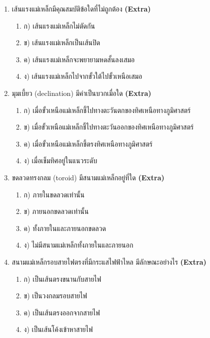 \documentclass[12pt]{article}
\begin{document}
\begin{enumerate}[label=\arabic*.]
\begin{enumerate}[label=)]
\item ก) เพิ่มเป็น 2 เท่า
\item ข) เพิ่มเป็น 4 เท่า
\item ค) ลดลงเป็น 1/2 เท่า
\item ง) ไม่เปลี่ยนแปลง
\end{enumerate}
\item เส้นแรงแม่เหล็กมีคุณสมบัติข้อใดที่ไม่ถูกต้อง \hfill \textbf{\small (Extra)}
\begin{enumerate}[label=)]
\item ก) เส้นแรงแม่เหล็กไม่ตัดกัน
\item ข) เส้นแรงแม่เหล็กเป็นเส้นปิด
\item ค) เส้นแรงแม่เหล็กจะพยายามหดสั้นลงเสมอ
\item ง) เส้นแรงแม่เหล็กไปจากขั้วใต้ไปขั้วเหนือเสมอ
\end{enumerate}
\item มุมเบี้ยว (declination) มีค่าเป็นบวกเมื่อใด \hfill \textbf{\small (Extra)}
\begin{enumerate}[label=)]
\item ก) เมื่อขั้วเหนือแม่เหล็กชี้ไปทางตะวันตกของทิศเหนือทางภูมิศาสตร์
\item ข) เมื่อขั้วเหนือแม่เหล็กชี้ไปทางตะวันออกของทิศเหนือทางภูมิศาสตร์
\item ค) เมื่อขั้วเหนือแม่เหล็กชี้ตรงทิศเหนือทางภูมิศาสตร์
\item ง) เมื่อเข็มทิศอยู่ในแนวระดับ
\end{enumerate}
\item ขดลวดทรงกลม (toroid) มีสนามแม่เหล็กอยู่ที่ใด \hfill \textbf{\small (Extra)}
\begin{enumerate}[label=)]
\item ก) ภายในขดลวดเท่านั้น
\item ข) ภายนอกขดลวดเท่านั้น
\item ค) ทั้งภายในและภายนอกขดลวด
\item ง) ไม่มีสนามแม่เหล็กทั้งภายในและภายนอก
\end{enumerate}
\item สนามแม่เหล็กรอบสายไฟตรงที่มีกระแสไฟฟ้าไหล มีลักษณะอย่างไร \hfill \textbf{\small (Extra)}
\begin{enumerate}[label=)]
\item ก) เป็นเส้นตรงขนานกับสายไฟ
\item ข) เป็นวงกลมรอบสายไฟ
\item ค) เป็นเส้นตรงออกจากสายไฟ
\item ง) เป็นเส้นโค้งเข้าหาสายไฟ
\end{enumerate}

\end{enumerate}
\end{document}
